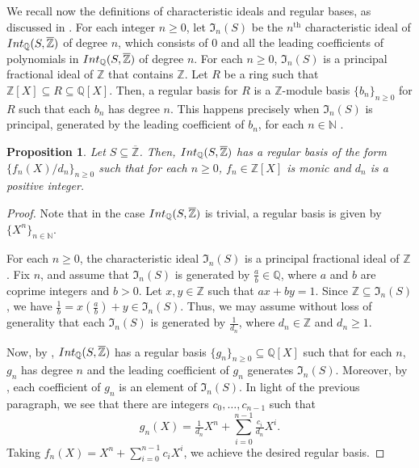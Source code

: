 \documentclass{article}
\newtheorem{Prop}[equation]{Proposition}
\theoremstyle{definition}\newtheorem{Def}[equation]{Definition}
\theoremstyle{definition}\newtheorem{Ques}[equation]{Question}
\theoremstyle{definition}\newtheorem{Conj}[equation]{Conjecture}
\theoremstyle{definition}\newtheorem{Not}[equation]{Notation}
\newcommand{\N}{\mathbb{N}}
\newcommand{\Q}{\mathbb{Q}}
\newcommand{\oZ}{\overline{\Z}}
\newcommand{\Z}{\mathbb{Z}}
\newcommand{\Int}{\textnormal{Int}}
\newcommand{\IntQ}{\Int_{\Q}}
\newcommand{\mfI}{\mathfrak{I}}
\numberwithin{equation}{section}
\begin{document}
We recall now the definitions of characteristic ideals and regular bases, as discussed in \cite[Section II.1]{CaCh}. For each integer $n \geq 0$, let $\mfI_n(S)$ be the $n^\text{th}$ characteristic ideal of $\IntQ(S,\oZ)$ of degree $n$, which consists of 0 and all the leading coefficients of polynomials in $\IntQ(S,\oZ)$ of degree $n$. For each $n \geq 0$, $\mfI_n(S)$ is a principal fractional ideal of $\Z$ that contains $\Z$. Let $R$ be a ring such that $\Z[X] \subseteq R \subseteq \Q[X]$. Then, a regular basis for $R$ is a $\Z$-module basis $\{b_n\}_{n \geq 0}$ for $R$ such that each $b_n$ has degree $n$. This happens precisely when $\mfI_n(S)$ is principal, generated by the leading coefficient of $b_n$, for each $n\in\N$ \cite[Theorem II.1.4]{CaCh}.

\begin{Prop}\label{Regular basis}
Let $S \subseteq \oZ$. Then, $\IntQ(S,\oZ)$ has a regular basis of the form $\{f_n(X)/d_n\}_{n \geq 0}$ such that for each $n \geq 0$, $f_n \in \Z[X]$ is monic and $d_n$ is a positive integer.
\end{Prop}
\begin{proof}
Note that in the case $\IntQ(S,\oZ)$ is trivial, a regular basis is given by $\{X^n\}_{n\in\N}$.

For each $n \geq 0$, the characteristic ideal $\mfI_n(S)$ is a principal fractional ideal of $\Z$. Fix $n$, and assume that $\mfI_n(S)$ is generated by $\tfrac{a}{b} \in \Q$, where $a$ and $b$ are coprime integers and $b > 0$. Let $x, y \in \Z$ such that $ax+by=1$. Since $\Z \subseteq \mfI_n(S)$, we have $\tfrac{1}{b} = x(\tfrac{a}{b}) + y \in \mfI_n(S)$. Thus, we may assume without loss of generality that each $\mfI_n(S)$ is generated by $\tfrac{1}{d_n}$, where $d_n \in \Z$ and $d_n \geq 1$.

Now, by \cite[Proposition II.1.4]{CaCh}, $\IntQ(S,\oZ)$ has a regular basis $\{g_n\}_{n \geq 0} \subseteq \Q[X]$ such that for each $n$, $g_n$ has degree $n$ and the leading coefficient of $g_n$ generates $\mfI_n(S)$. Moreover, by \cite[Proposition II.1.7]{CaCh}, each coefficient of $g_n$ is an element of $\mfI_n(S)$. In light of the previous paragraph, we see that there are integers $c_0, \ldots, c_{n-1}$ such that
\begin{equation*}
g_n(X) = \tfrac{1}{d_n}X^n + \sum_{i=0}^{n-1} \tfrac{c_i}{d_n}X^i.
\end{equation*}
Taking $f_n(X) = X^n + \sum_{i=0}^{n-1} c_iX^i$, we achieve the desired regular basis.
\end{proof}
\end{document}
